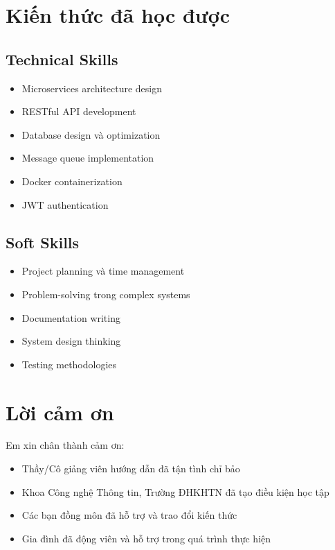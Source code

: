 \documentclass[12pt,a4paper]{report}
\begin{document}
\section{Kiến thức đã học được}
\subsection{Technical Skills}
\begin{itemize}
    \item Microservices architecture design
    \item RESTful API development
    \item Database design và optimization
    \item Message queue implementation
    \item Docker containerization
    \item JWT authentication
\end{itemize}

\subsection{Soft Skills}
\begin{itemize}
    \item Project planning và time management
    \item Problem-solving trong complex systems
    \item Documentation writing
    \item System design thinking
    \item Testing methodologies
\end{itemize}

\section{Lời cảm ơn}
Em xin chân thành cảm ơn:
\begin{itemize}
    \item Thầy/Cô giảng viên hướng dẫn đã tận tình chỉ bảo
    \item Khoa Công nghệ Thông tin, Trường ĐHKHTN đã tạo điều kiện học tập
    \item Các bạn đồng môn đã hỗ trợ và trao đổi kiến thức
    \item Gia đình đã động viên và hỗ trợ trong quá trình thực hiện
\end{itemize}
\end{document}
